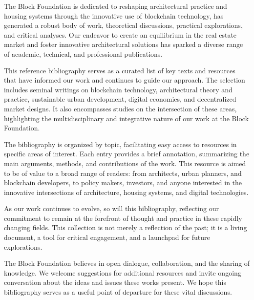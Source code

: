 The Block Foundation is dedicated to reshaping architectural practice and housing systems through the innovative use of blockchain technology, has generated a robust body of work, theoretical discussions, practical explorations, and critical analyses. Our endeavor to create an equilibrium in the real estate market and foster innovative architectural solutions has sparked a diverse range of academic, technical, and professional publications.

This reference bibliography serves as a curated list of key texts and resources that have informed our work and continues to guide our approach. The selection includes seminal writings on blockchain technology, architectural theory and practice, sustainable urban development, digital economies, and decentralized market designs. It also encompasses studies on the intersection of these areas, highlighting the multidisciplinary and integrative nature of our work at the Block Foundation.

The bibliography is organized by topic, facilitating easy access to resources in specific areas of interest. Each entry provides a brief annotation, summarizing the main arguments, methods, and contributions of the work. This resource is aimed to be of value to a broad range of readers: from architects, urban planners, and blockchain developers, to policy makers, investors, and anyone interested in the innovative intersections of architecture, housing systems, and digital technologies.

As our work continues to evolve, so will this bibliography, reflecting our commitment to remain at the forefront of thought and practice in these rapidly changing fields. This collection is not merely a reflection of the past; it is a living document, a tool for critical engagement, and a launchpad for future explorations.

The Block Foundation believes in open dialogue, collaboration, and the sharing of knowledge. We welcome suggestions for additional resources and invite ongoing conversation about the ideas and issues these works present. We hope this bibliography serves as a useful point of departure for these vital discussions.
